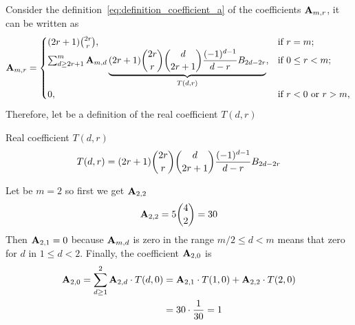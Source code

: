 Consider the definition~\eqref{eq:definition_coefficient_a} of the coefficients ${\mathbf{A}} \sb{m,r}$, it can be written as
\begin{equation*}
    {\mathbf{A}} \sb{m,r} =
    \begin{cases}
    (2r+1)
        \binom{2r}{r}, & \text{if } r=m; \\
        \sum_{d \geq 2r+1}^{m} {\mathbf{A}} \sb{m,d} \underbrace{(2r+1) \binom{2r}{r} \binom{d}{2r+1} \frac{(-1)^{d-1}}{d-r} {B}\sb{2d-2r}}_{T(d,r)}, & \text{if } 0 \leq r<m; \\
        0, & \text{if } r<0 \text{ or } r>m,
    \end{cases}
\end{equation*}
Therefore, let be a definition of the real coefficient $T(d,r)$
\begin{definition}
    Real coefficient $T(d,r)$
    \begin{equation*}
        T(d,r) = (2r+1) \binom{2r}{r} \binom{d}{2r+1} \frac{(-1)^{d-1}}{d-r} {B}\sb{2d-2r}
    \end{equation*}
\end{definition}
\begin{example}
    Let be $m=2$ so first we get ${\mathbf{A}} \sb{2,2}$
    \begin{equation*}
        {\mathbf{A}} \sb{2,2} = 5\binom{4}{2}=30
    \end{equation*}
    Then ${\mathbf{A}} \sb{2,1} = 0$ because ${\mathbf{A}} \sb{m,d}$ is zero in the range $m/2 \leq d < m$ means that zero for $d$
    in $1 \leq d < 2$.
    Finally, the coefficient ${\mathbf{A}} \sb{2,0}$ is
    \begin{equation*}
        \begin{split}
            {\mathbf{A}} \sb{2,0}
            = \sum_{d \geq 1}^{2} {\mathbf{A}} \sb{2,d} \cdot T(d, 0)
            &= {\mathbf{A}} \sb{2,1} \cdot T(1, 0) + {\mathbf{A}} \sb{2,2} \cdot T(2, 0) \\
            &= 30 \cdot \frac{1}{30} = 1
        \end{split}
    \end{equation*}
\end{example}
